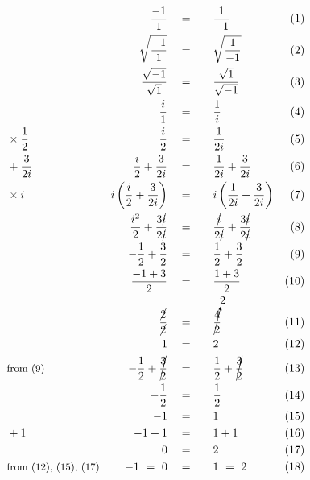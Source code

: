 \begin{alignat*}{5}
&\,&\frac{-1}{1}\quad&=\quad&&\frac{1}{-1}\qquad&(1)\\
&\,&\sqrt{\frac{-1}{1}}\quad&=&&\sqrt{\frac{1}{-1}}&(2)\\
&\,&\frac{\sqrt{-1}}{\sqrt{1}}\quad&=&&\frac{\sqrt{1}}{\sqrt{-1}}&(3)\\
&\,&\frac{i}{1}\quad&=&&\frac{1}{i}&(4)\\
&\small\times\frac{1}{2}&\frac{i}{2}\quad&=&&\frac{1}{2i}&(5)\\
&\small+\frac{3}{2i}&\frac{i}{2}+\frac{3}{2i}\quad&=&&\frac{1}{2i}+\frac{3}{2i}&(6)\\
&\times i&i\left(\frac{i}{2}+\frac{3}{2i}\right)\quad&=&&i\left(\frac{1}{2i}+\frac{3}{2i}\right)&(7)\\
&\,&\frac{i^2}{2}+\frac{3\cancel{i}}{2\cancel{i}}\quad&=&&\frac{\cancel{i}}{2\cancel{i}}+\frac{3\cancel{i}}{2\cancel{i}}&(8)\\
&\,&-\frac{1}{2}+\frac{3}{2}\quad&=&&\frac{1}{2}+\frac{3}{2}&(9)\\
&\,&\frac{-1+3}{2}\quad&=&&\frac{1+3}{2}&(10)\\
&\,&\frac{\cancel{2}}{\cancel{2}}\quad&=&&\cancelto{2}{\frac{4}{2}}&(11)\\
&\,&1\quad&=&&2&(12)\\
&\small\text{from (9)}&-\frac{1}{2}+\cancel{\frac{3}{2}}\quad&=&&\frac{1}{2}+\cancel{\frac{3}{2}}&(13)\\
&\,&-\frac{1}{2}\quad&=&&\frac{1}{2}&(14)\\
&\,&-1\quad&=&&1&(15)\\
&\small+1&-1+1\quad&=&&1+1&(16)\\
&\,&0\quad&=&&2&(17)\\
&\small\text{from (12), (15), (17)}&-1~=~0\quad&=&&1~=~2&(18)
\end{alignat*}
